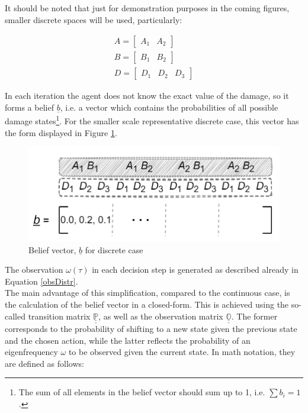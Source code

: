 It should be noted that just for demonstration purposes in the coming figures, smaller discrete spaces will be used, particularly:

\begin{gather*}
    A = 
    \begin{bmatrix}
        A_1 & A_2
    \end{bmatrix} \\
    B = 
    \begin{bmatrix}
        B_1 & B_2
    \end{bmatrix} \\
    D = 
    \begin{bmatrix}
        D_1 & D_2 & D_3
    \end{bmatrix}
\end{gather*}


In each iteration the agent does not know the exact value of the damage, so it forms a belief $\underline{b}$, i.e. a vector which contains the probabilities of all possible damage states\footnote{The sum of all elements in the belief vector should sum up to 1, i.e. $\sum b_i = 1$.}. For the smaller scale representative discrete case, this vector has the form displayed in Figure \ref{beliefDisc}. 

\begin{figure}[H]
    \centering
	\includegraphics[width=0.5\linewidth]{Figures/beliefDiscrete.png}
	\caption{Belief vector, $\underline{b}$ for discrete case}
	\label{beliefDisc}
\end{figure}

The observation $\omega (\tau)$ in each decision step is generated as described already in Equation \ref{obsDistr}.\\

The main advantage of this simplification, compared to the continuous case, is the calculation of the belief vector in a closed-form. This is achieved using the so-called transition matrix $\underline{\underline{\mathbb{P}}}$, as well as the observation matrix $\underline{\underline{\mathbb{O}}}$. The former corresponds to the probability of shifting to a new state given the previous state and the chosen action, while the latter reflects the probability of an eigenfrequency $\omega$ to be observed given the current state. In math notation, they are defined as follows:

